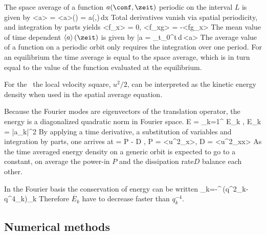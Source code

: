 The space average of a function $a(\conf, \zeit)$ periodic on the interval $L$ is given by
\beq
\left<a\right> = \left<a\right>(\zeit) = \oint a(\conf,\zeit)\,dx
\eeq
Total derivatives vanish via spatial periodicity, and integration by parts yields
\beq \nonumber
\left<f_x\right> = 0, \quad \left<f_xg\right> = -\left<fg_x\right>
\eeq
The mean value of time dependent $\left<a\right>(\zeit)$ is given by
\beq
\bar{a} = \lim_{t\to\infty}\int_{0}^{t}\,d\tau \,\left<a\right>
\eeq
The average value of a function on a periodic orbit only requires the
integration over one period. For an equilibrium the time
average is equal to the space average, which is in turn equal to the
value of the function evaluated at the equilibrium.

For the \KSe\ the local velocity square, ${u^2}/{2}$, can be interpreted
as the kinetic energy density when used in the spatial average equation.

Because the Fourier modes are eigenvectors of the translation operator,
the energy is a diagonalized quadratic norm in Fourier space.
\beq
E = \sum_{k=1}^{\infty} E_k , \quad E_k = |a_k|^2
\eeq
By applying a time derivative, a substitution of variables and
integration by parts, one arrives at
\beq
{} = P - D , \quad P = \left<u^2_x\right>, \quad D = \left<u^2_{xx}\right>
\eeq
As the time averaged energy density on a generic orbit is expected to go
to a constant, on average the power-in $P$ and the dissipation rate$D$
balance each other.

In the Fourier basis the conservation of energy can be written
\beq
\sum_{k=-\infty}^{\infty}\,(q^2_k-q^4_k)_k
\eeq
Therefore $\overline{E}_k$ have to decrease faster than $q^{-4}_k$.

\subsection{Numerical methods}
\label{sect:MNGnumMeth}


